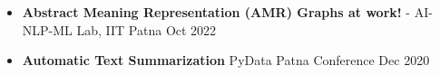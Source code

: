 \vspace{-1.5em}
\begin{talks}
    \talk
	{}
	{
	\begin{itemize}[leftmargin=.4in]
	    \item \textbf{Abstract Meaning Representation (AMR) Graphs at work!} - AI-NLP-ML Lab, IIT Patna \hfill Oct 2022
	    \item \textbf{Automatic Text Summarization} PyData Patna Conference \hfill Dec 2020
	\end{itemize}
	}
\end{talks}
\vspace{-3mm}
